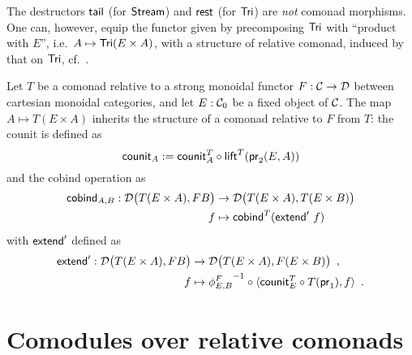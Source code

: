 \documentclass[envcountsame]{llncs}
\begin{document}



\begin{Long}

\begin{remark}
 The destructors $\stail$ (for $\stream$) and $\tail$ (for $\Tri$) are \emph{not} comonad morphisms.
 One can, however, equip the functor given by precomposing $\Tri$ with \enquote{product with $E$}, i.e.\
 $A \mapsto \Tri (E\times A)$, with a structure of relative comonad, induced by that
 on $\Tri$, cf.\ \Cref{product_comonad}.
\end{remark}


\begin{definition}\label{product_comonad}
  Let $T$ be a comonad relative to a strong monoidal functor $F:\C\to\D$ between cartesian monoidal categories,
  and let $E:\C_0$ be a fixed object of $\C$.
 The map $A\mapsto T(E\times A)$ inherits the structure of a comonad relative to $F$ from $T$: the 
 counit is defined as
   \[ \counit_A := \comp{\lift^T(\pr_2(E,A))}{\counit^T_{A}} \]
  and the cobind operation as
   \begin{align*} 
            \cobind_{A,B} : \D\bigl(T(E\times A),FB\bigr) &\to \D\bigl(T(E\times A),T(E\times B)\bigr) \\
              f &\mapsto  \cobind^T(\extend'~f)
   \end{align*}
  with $\extend'$ defined as 
  \begin{align*} \extend' : \D\bigl(T(E\times A),FB\bigr) &\to \D\bigl(T(E\times A), F(E\times B)\bigr) \enspace , \\ 
                                            f & \mapsto \comp{\langle \comp{T(\pr_1)}{\counit^T_E}, f \rangle}{{\phi^{F}_{E,B}}^{-1}} \enspace .
  \end{align*}
\end{definition}

\end{Long}




\section{Comodules over relative comonads}\label{sec:comodules}
\end{document}
